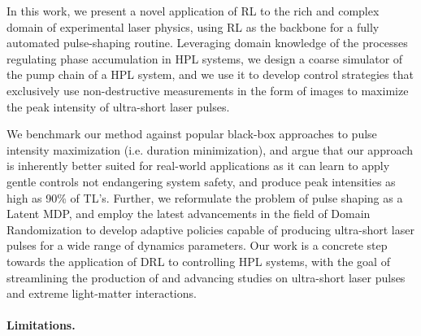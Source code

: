 In this work, we present a novel application of RL to the rich and complex domain of experimental laser physics, using RL as the backbone for a fully automated pulse-shaping routine. Leveraging domain knowledge of the processes regulating phase accumulation in HPL systems, we design a coarse simulator of the pump chain of a HPL system, and we use it to develop control strategies that exclusively use non-destructive measurements in the form of images to maximize the peak intensity of ultra-short laser pulses.

We benchmark our method against popular black-box approaches to pulse intensity maximization (i.e. duration minimization), and argue that our approach is inherently better suited for real-world applications as it can learn to apply gentle controls not endangering system safety, and produce peak intensities as high as 90\% of TL's. Further, we reformulate the problem of pulse shaping as a Latent MDP, and employ the latest advancements in the field of Domain Randomization to develop adaptive policies capable of producing ultra-short laser pulses for a wide range of dynamics parameters.
Our work is a concrete step towards the application of DRL to controlling HPL systems, with the goal of streamlining the production of and advancing studies on ultra-short laser pulses and extreme light-matter interactions.

\paragraph{Limitations.}


